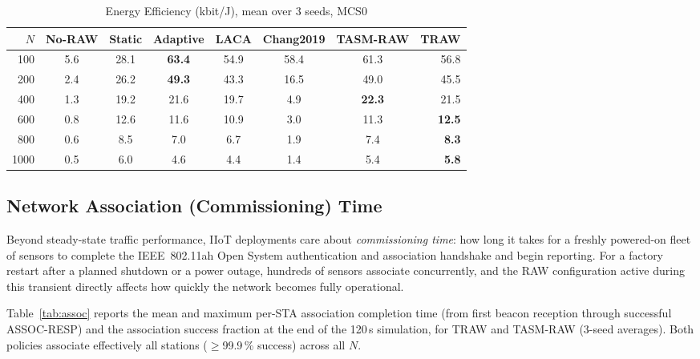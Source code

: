\documentclass[journal]{IEEEtran}
\begin{document}
\begin{table}[!t]
\renewcommand{\arraystretch}{1.15}
\caption{Energy Efficiency (kbit/J), mean over 3 seeds, MCS0}
\label{tab:ee}
\centering
\setlength{\tabcolsep}{3.5pt}
\begin{tabular}{@{}rccccccr@{}}
\toprule
$N$ & No-RAW & Static & Adaptive & LACA & Chang2019 & TASM-RAW & \textbf{TRAW} \\
\midrule
 100 &  5.6 & 28.1 & \textbf{63.4} & 54.9 & 58.4 & 61.3 & 56.8 \\
 200 &  2.4 & 26.2 & \textbf{49.3} & 43.3 & 16.5 & 49.0 & 45.5 \\
 400 &  1.3 & 19.2 & 21.6 & 19.7 &  4.9 & \textbf{22.3} & 21.5 \\
 600 &  0.8 & 12.6 & 11.6 & 10.9 &  3.0 & 11.3 & \textbf{12.5} \\
 800 &  0.6 &  8.5 &  7.0 &  6.7 &  1.9 &  7.4 & \textbf{8.3} \\
1000 &  0.5 &  6.0 &  4.6 &  4.4 &  1.4 &  5.4 & \textbf{5.8} \\
\bottomrule
\end{tabular}
\end{table}

\subsection{Network Association (Commissioning) Time}
\label{sec:assoc}

Beyond steady-state traffic performance, IIoT deployments care about
\emph{commissioning time}: how long it takes for a freshly powered-on
fleet of sensors to complete the IEEE~802.11ah Open System
authentication and association handshake and begin reporting.
For a factory restart after a planned shutdown or a power outage,
hundreds of sensors associate concurrently, and the RAW configuration
active during this transient directly affects how quickly the network
becomes fully operational.

Table~\ref{tab:assoc} reports the mean and maximum per-STA association
completion time (from first beacon reception through successful
ASSOC-RESP) and the association success fraction at the end of the
120\,s simulation, for TRAW and TASM-RAW (3-seed averages).
Both policies associate effectively all stations
($\geq$99.9\,\% success) across all $N$.
\end{document}
